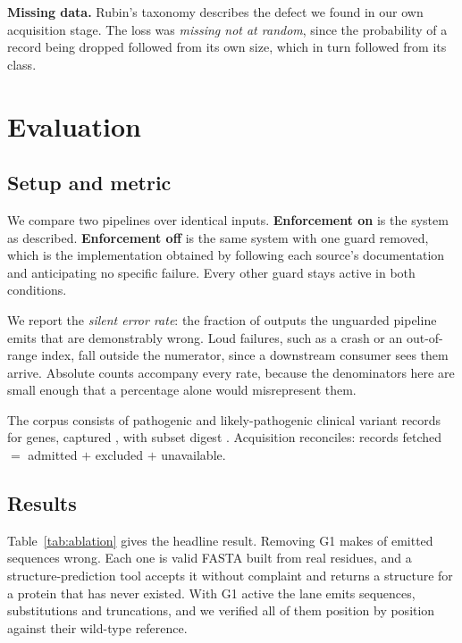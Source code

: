 \documentclass{article}
\begin{document}
\textbf{Missing data.} Rubin's taxonomy \citep{rubin} describes the defect we
found in our own acquisition stage. The loss was \emph{missing not at random},
since the probability of a record being dropped followed from its own size,
which in turn followed from its class.



\section{Evaluation}
\label{sec:eval}

\subsection{Setup and metric}

We compare two pipelines over identical inputs. \textbf{Enforcement on} is the
system as described. \textbf{Enforcement off} is the same system with one
guard removed, which is the implementation obtained by following each source's
documentation and anticipating no specific failure. Every other guard stays
active in both conditions.

We report the \emph{silent error rate}: the fraction of outputs the unguarded
pipeline emits that are demonstrably wrong. Loud failures, such as a crash or
an out-of-range index, fall outside the numerator, since a downstream consumer
sees them arrive. Absolute counts accompany every rate, because the
denominators here are small enough that a percentage alone would misrepresent
them.

The corpus consists of pathogenic and likely-pathogenic clinical variant
records for \NumGenes{} genes, captured \CorpusDate{}, with subset digest
\texttt{\CorpusDigest{}}. Acquisition reconciles: \CorpusFetched{} records
fetched $=$ \CorpusKept{} admitted $+$ \CorpusExcluded{} excluded $+$
\CorpusUnavailable{} unavailable.

\subsection{Results}

\begin{table}[h]
\centering
\caption{Silent errors prevented. Rates are over what the unguarded pipeline
emits, with loud failures excluded from the numerator.}
\label{tab:ablation}
\AblationTable
\end{table}

Table~\ref{tab:ablation} gives the headline result. Removing G1 makes
\GOneWrong{} of \GOneNaive{} emitted sequences wrong. Each one is valid FASTA
built from real residues, and a structure-prediction tool accepts it without
complaint and returns a structure for a protein that has never existed. With
G1 active the lane emits \GOneEmits{} sequences, \GOneMissense{} substitutions
and \GOneTruncating{} truncations, and we verified all \GOneEmits{} of them
position by position against their wild-type reference.
\end{document}
